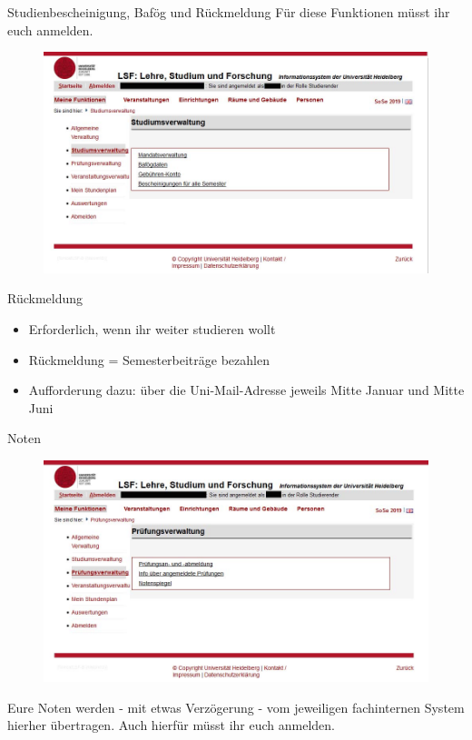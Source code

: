 \begin{frame}{Studienbescheinigung, Bafög und Rückmeldung}
    Für diese Funktionen müsst ihr euch anmelden.
    \begin{figure}
        \centering
        \includegraphics[scale=0.3]{images/lsf12.jpg}
    \end{figure}
\end{frame}

\begin{frame}{Rückmeldung}
    \begin{itemize}
        \item{Erforderlich, wenn ihr weiter studieren wollt}
        \item{Rückmeldung = Semesterbeiträge bezahlen}
        \item{Aufforderung dazu: über die Uni-Mail-Adresse jeweils Mitte Januar und Mitte Juni}
    \end{itemize}
\end{frame}

\begin{frame}{Noten}
    \begin{figure}
        \centering
        \includegraphics[scale=0.3]{images/lsf13.jpg}
    \end{figure}
    Eure Noten werden - mit etwas Verzögerung - vom jeweiligen fachinternen System hierher übertragen. Auch hierfür müsst ihr euch anmelden.
\end{frame}

